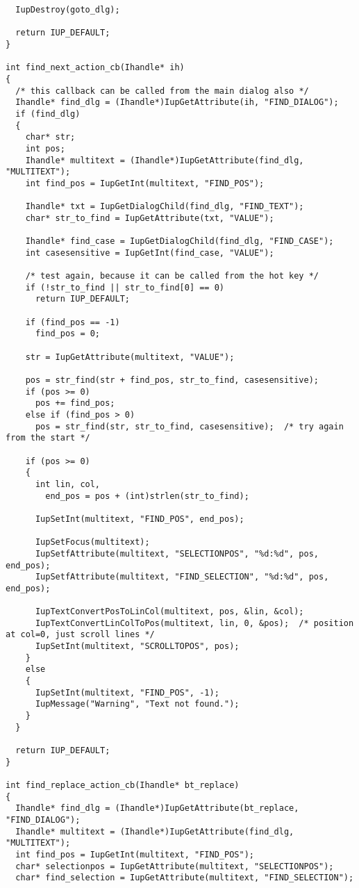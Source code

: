 \documentclass{ctexart}
\begin{document}
\begin{lstlisting}
  IupDestroy(goto_dlg);

  return IUP_DEFAULT;
}

int find_next_action_cb(Ihandle* ih)
{
  /* this callback can be called from the main dialog also */
  Ihandle* find_dlg = (Ihandle*)IupGetAttribute(ih, "FIND_DIALOG");
  if (find_dlg)
  {
    char* str;
    int pos;
    Ihandle* multitext = (Ihandle*)IupGetAttribute(find_dlg, "MULTITEXT");
    int find_pos = IupGetInt(multitext, "FIND_POS");

    Ihandle* txt = IupGetDialogChild(find_dlg, "FIND_TEXT");
    char* str_to_find = IupGetAttribute(txt, "VALUE");

    Ihandle* find_case = IupGetDialogChild(find_dlg, "FIND_CASE");
    int casesensitive = IupGetInt(find_case, "VALUE");

    /* test again, because it can be called from the hot key */
    if (!str_to_find || str_to_find[0] == 0)
      return IUP_DEFAULT;

    if (find_pos == -1)
      find_pos = 0;

    str = IupGetAttribute(multitext, "VALUE");

    pos = str_find(str + find_pos, str_to_find, casesensitive);
    if (pos >= 0)
      pos += find_pos;
    else if (find_pos > 0)
      pos = str_find(str, str_to_find, casesensitive);  /* try again from the start */

    if (pos >= 0)
    {
      int lin, col,
        end_pos = pos + (int)strlen(str_to_find);

      IupSetInt(multitext, "FIND_POS", end_pos);

      IupSetFocus(multitext);
      IupSetfAttribute(multitext, "SELECTIONPOS", "%d:%d", pos, end_pos);
      IupSetfAttribute(multitext, "FIND_SELECTION", "%d:%d", pos, end_pos);

      IupTextConvertPosToLinCol(multitext, pos, &lin, &col);
      IupTextConvertLinColToPos(multitext, lin, 0, &pos);  /* position at col=0, just scroll lines */
      IupSetInt(multitext, "SCROLLTOPOS", pos);
    }
    else
    {
      IupSetInt(multitext, "FIND_POS", -1);
      IupMessage("Warning", "Text not found.");
    }
  }

  return IUP_DEFAULT;
}

int find_replace_action_cb(Ihandle* bt_replace)
{
  Ihandle* find_dlg = (Ihandle*)IupGetAttribute(bt_replace, "FIND_DIALOG");
  Ihandle* multitext = (Ihandle*)IupGetAttribute(find_dlg, "MULTITEXT");
  int find_pos = IupGetInt(multitext, "FIND_POS");
  char* selectionpos = IupGetAttribute(multitext, "SELECTIONPOS");
  char* find_selection = IupGetAttribute(multitext, "FIND_SELECTION");


\end{lstlisting}
\end{document}
